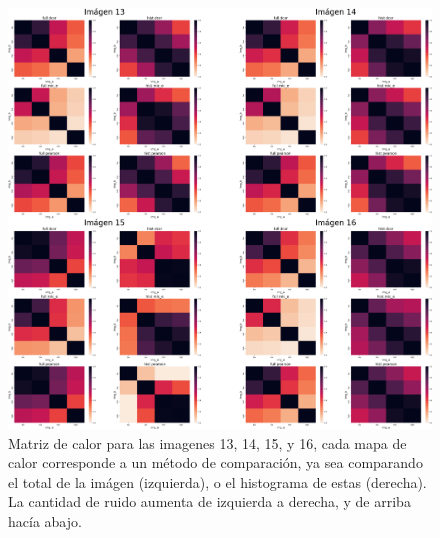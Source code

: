 \begin{figure}
    \centering
    \includegraphics[width=\textwidth]{figuras/heatmaps/heatmaps_app_3.png}
    \caption{Matriz de calor para las imagenes 13, 14, 15, y 16, cada mapa de calor corresponde a un m\'etodo de comparaci\'on, ya sea comparando el total de la im\'agen (izquierda), o el histograma de estas (derecha). La cantidad de ruido aumenta de izquierda a derecha, y de arriba hacía abajo.}
\end{figure}


